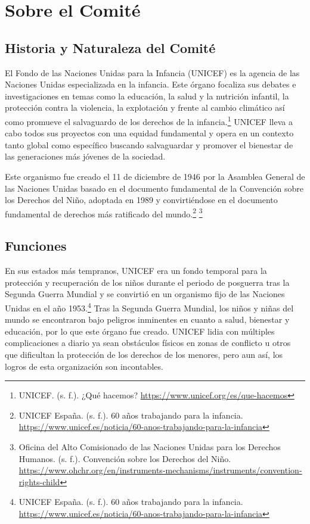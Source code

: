 \section{Sobre el Comité}

\subsection{Historia y Naturaleza del Comité}

El Fondo de las Naciones Unidas para la Infancia (UNICEF) es la agencia de las Naciones Unidas especializada en la infancia. Este órgano focaliza sus debates e investigaciones en temas como la educación, la salud y la nutrición infantil, la protección contra la violencia, la explotación y frente al cambio climático así como promueve el salvaguardo de los derechos de la infancia.\footnote{UNICEF. (s. f.). ¿Qué hacemos? \url{https://www.unicef.org/es/que-hacemos}} UNICEF lleva a cabo todos sus proyectos con una equidad fundamental y opera en un contexto tanto global como específico buscando salvaguardar y promover el bienestar de las generaciones más jóvenes de la sociedad.

Este organismo fue creado el 11 de diciembre de 1946 por la Asamblea General de las Naciones Unidas basado en el documento fundamental de la Convención sobre los Derechos del Niño, adoptada en 1989 y convirtiéndose en el documento fundamental de derechos más ratificado del mundo.\footnote{UNICEF España. (s. f.). 60 años trabajando para la infancia. \url{https://www.unicef.es/noticia/60-anos-trabajando-para-la-infancia}} \footnote{Oficina del Alto Comisionado de las Naciones Unidas para los Derechos Humanos. (s. f.). Convención sobre los Derechos del Niño. \url{https://www.ohchr.org/en/instruments-mechanisms/instruments/convention-rights-child}}

\subsection{Funciones}

En sus estados más tempranos, UNICEF era un fondo temporal para la protección y recuperación de los niños durante el periodo de posguerra tras la Segunda Guerra Mundial y se convirtió en un organismo fijo de las Naciones Unidas en el año 1953.\footnote{UNICEF España. (s. f.). 60 años trabajando para la infancia. \url{https://www.unicef.es/noticia/60-anos-trabajando-para-la-infancia}} Tras la Segunda Guerra Mundial, los niños y niñas del mundo se encontraron bajo peligros inminentes en cuanto a salud, bienestar y educación, por lo que este órgano fue creado. UNICEF lidia con múltiples complicaciones a diario ya sean obstáculos físicos en zonas de conflicto u otros que dificultan la protección de los derechos de los menores, pero aun así, los logros de esta organización son incontables.

